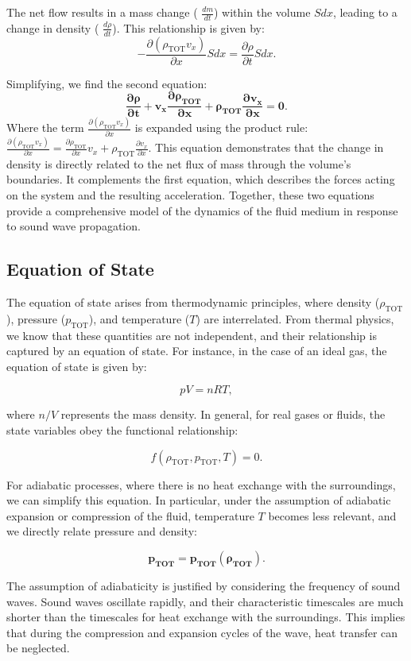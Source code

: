 \documentclass[a4paper]{article}
\begin{document}
The net flow results in a mass change ( \(\frac{dm}{dt}\)) within the volume \(Sdx\), leading to a change in density ( \(\frac{d\rho}{dt}\)). This relationship is given by:
\[
- \frac{\partial (\rho_\text{TOT} v_x)}{\partial x} S dx = \frac{\partial \rho}{\partial t} S dx.
\]

Simplifying, we find the second equation:
\[
\mathbf{\frac{\partial \rho}{\partial t} + v_x \frac{\partial \rho_\text{TOT}}{\partial x} + \rho_\text{TOT} \frac{\partial v_x}{\partial x} = 0.}
\]
Where the term \(\frac{\partial (\rho_\text{TOT} v_x)}{\partial x}\) is expanded using the product rule:
   \(
   \frac{\partial (\rho_\text{TOT} v_x)}{\partial x} = \frac{\partial \rho_\text{TOT}}{\partial x} v_x + \rho_\text{TOT} \frac{\partial v_x}{\partial x}.
   \)
This equation demonstrates that the change in density is directly related to the net flux of mass through the volume's boundaries. It complements the first equation, which describes the forces acting on the system and the resulting acceleration. Together, these two equations provide a comprehensive model of the dynamics of the fluid medium in response to sound wave propagation.

\subsection{Equation of State}
The equation of state arises from thermodynamic principles, where density (\(\rho_\text{TOT}\)), pressure (\(p_\text{TOT}\)), and temperature (\(T\)) are interrelated. From thermal physics, we know that these quantities are not independent, and their relationship is captured by an equation of state. For instance, in the case of an ideal gas, the equation of state is given by:

\[
pV = nRT,
\]

where \(n/V\) represents the mass density. In general, for real gases or fluids, the state variables obey the functional relationship:

\[
f(\rho_\text{TOT}, p_\text{TOT}, T) = 0.
\]

For adiabatic processes, where there is no heat exchange with the surroundings, we can simplify this equation. In particular, under the assumption of adiabatic expansion or compression of the fluid, temperature \(T\) becomes less relevant, and we directly relate pressure and density:

\[
\mathbf{p_\text{TOT} = p_\text{TOT}(\rho_\text{TOT})}.
\]

The assumption of adiabaticity is justified by considering the frequency of sound waves. Sound waves oscillate rapidly, and their characteristic timescales are much shorter than the timescales for heat exchange with the surroundings. This implies that during the compression and expansion cycles of the wave, heat transfer can be neglected.
\end{document}
